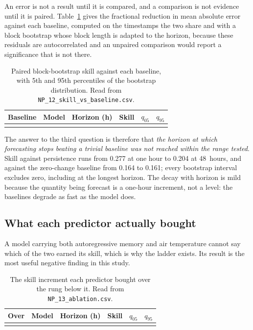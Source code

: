 \documentclass[11pt,a4paper]{article}
\begin{document}
An error is not a result until it is compared, and a comparison is not evidence
until it is paired. Table~\ref{tab:skill} gives the fractional reduction in mean
absolute error against each baseline, computed on the timestamps the two share
and with a block bootstrap whose block length is adapted to the horizon, because
these residuals are autocorrelated and an unpaired comparison would report a
significance that is not there.

\begin{table}[H]
\centering
\caption{Paired block-bootstrap skill against each baseline, with 5th and 95th
percentiles of the bootstrap distribution. Read from
\texttt{NP\_12\_skill\_vs\_baseline.csv}.}
\label{tab:skill}
\begin{tabular}{llrrrr}
\toprule
Baseline & Model & Horizon (h) & Skill & $q_{05}$ & $q_{95}$ \\
\midrule
\\
\bottomrule
\end{tabular}
\end{table}

The answer to the third question is therefore that \emph{the horizon at which
forecasting stops beating a trivial baseline was not reached within the range
tested}. Skill against persistence runs from 0.277 at one hour to 0.204 at
48~hours, and against the zero-change baseline from 0.164 to 0.161; every
bootstrap interval excludes zero, including at the longest horizon. The decay
with horizon is mild because the quantity being forecast is a one-hour
increment, not a level: the baselines degrade as fast as the model does.

\subsection{What each predictor actually bought}

A model carrying both autoregressive memory and air temperature cannot say which
of the two earned its skill, which is why the ladder exists. Its result is the
most useful negative finding in this study.

\begin{table}[H]
\centering
\caption{The skill increment each predictor bought over the rung below it. Read
from \texttt{NP\_13\_ablation.csv}.}
\label{tab:ablation}
\begin{tabular}{llrrrr}
\toprule
Over & Model & Horizon (h) & Skill & $q_{05}$ & $q_{95}$ \\
\midrule
\\
\bottomrule
\end{tabular}
\end{table}
\end{document}
